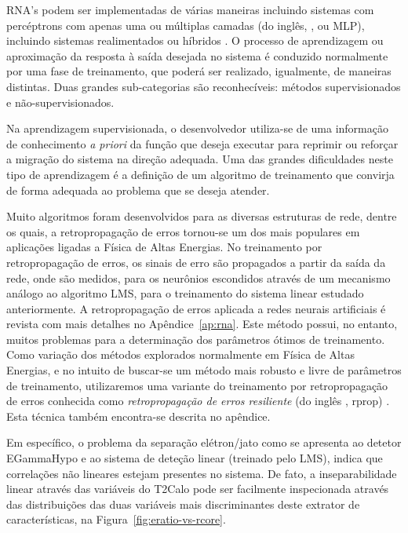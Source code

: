 RNA's podem ser implementadas de várias maneiras incluindo sistemas com
percéptrons com apenas uma ou múltiplas camadas (do inglês, , ou MLP), incluindo sistemas realimentados ou híbridos
\cite{haykin}. O processo de aprendizagem ou aproximação da resposta à saída
desejada no sistema é conduzido normalmente por uma fase de treinamento, que
poderá ser realizado, igualmente, de maneiras distintas. Duas grandes
sub-categorias são reconhecíveis: métodos supervisionados e
não-supervisionados.

Na aprendizagem supervisionada, o desenvolvedor utiliza-se de uma informação
de conhecimento \textit{a priori} da função que deseja executar para reprimir
ou reforçar a migração do sistema na direção adequada. Uma das grandes
dificuldades neste tipo de aprendizagem é a definição de um algoritmo de
treinamento que convirja de forma adequada ao problema que se deseja atender.

Muito algoritmos foram desenvolvidos para as diversas estruturas de rede,
dentre os quais, a retropropagação de erros tornou-se um dos mais populares em
aplicações ligadas a Física de Altas Energias. No treinamento por
retropropagação de erros, os sinais de erro são propagados a partir da saída
da rede, onde são medidos, para os neurônios escondidos através de um
mecanismo análogo ao algoritmo LMS, para o treinamento do sistema linear
estudado anteriormente. A retropropagação de erros aplicada a redes neurais
artificiais é revista com mais detalhes no Apêndice~\ref{ap:rna}. Este método
possui, no entanto, muitos problemas para a determinação dos parâmetros ótimos
de treinamento. Como variação dos métodos explorados normalmente em Física de
Altas Energias, e no intuito de buscar-se um método mais robusto e livre de
parâmetros de treinamento, utilizaremos uma variante do treinamento por
retropropagação de erros conhecida como \textit{retropropagação de erros
resiliente} (do inglês , rprop)
\cite{rprop}. Esta técnica também encontra-se descrita no apêndice.

Em específico, o problema da separação elétron/jato como se apresenta ao
detetor EGammaHypo e ao sistema de deteção linear (treinado pelo LMS), indica
que correlações não lineares estejam presentes no sistema. De fato, a
inseparabilidade linear através das variáveis do T2Calo pode ser facilmente
inspecionada através das distribuições das duas variáveis mais discriminantes
deste extrator de características, na Figura~\ref{fig:eratio-vs-rcore}.

